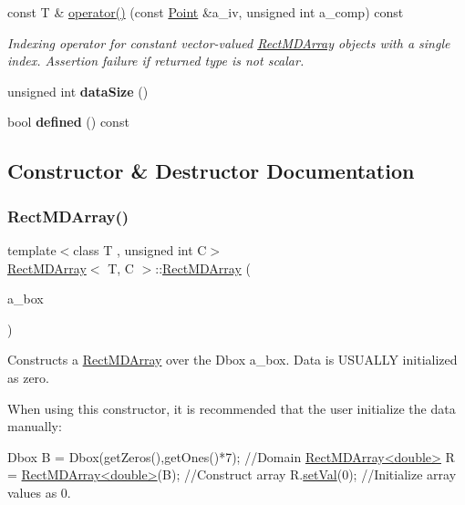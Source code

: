 \begin{DoxyCompactItemize}
const T \& \hyperlink{class_rect_m_d_array_a9b2580f04b9b32089d04826aec554ff9}{operator()} (const \hyperlink{class_point}{Point} \&a\+\_\+iv, unsigned int a\+\_\+comp) const
\begin{DoxyCompactList}\small\item\em Indexing operator for constant vector-\/valued \hyperlink{class_rect_m_d_array}{Rect\+M\+D\+Array} objects with a single index. Assertion failure if returned type is not scalar. \end{DoxyCompactList}\item 
\mbox{\label{class_rect_m_d_array_aae493b00e6278af8f6864e90bf4e7120}} 
unsigned int {\bfseries data\+Size} ()
\item 
\mbox{\label{class_rect_m_d_array_ae2ec8b62ab54e28eaf152b3f63ddb914}} 
bool {\bfseries defined} () const
\end{DoxyCompactItemize}


\subsection{Constructor \& Destructor Documentation}
\mbox{\label{class_rect_m_d_array_ab35dbe45e315471e0fc10002b17e728d}} 
\subsubsection{\texorpdfstring{Rect\+M\+D\+Array()}{RectMDArray()}}
{\footnotesize\ttfamily template$<$class T , unsigned int C$>$ \\
\hyperlink{class_rect_m_d_array}{Rect\+M\+D\+Array}$<$ T, C $>$\+::\hyperlink{class_rect_m_d_array}{Rect\+M\+D\+Array} (\begin{DoxyParamCaption}\item[{const \hyperlink{class_d_box}{D\+Box} \&}]{a\+\_\+box }\end{DoxyParamCaption})}



Constructs a \hyperlink{class_rect_m_d_array}{Rect\+M\+D\+Array} over the Dbox a\+\_\+box. Data is U\+S\+U\+A\+L\+LY initialized as zero. 

When using this constructor, it is recommended that the user initialize the data manually\+: 
\begin{DoxyCode}
Dbox B = Dbox(getZeros(),getOnes()*7);  \textcolor{comment}{//Domain}
\hyperlink{class_rect_m_d_array}{RectMDArray<double>} R = \hyperlink{class_rect_m_d_array}{RectMDArray<double>}(B); \textcolor{comment}{//Construct array}
R.\hyperlink{class_rect_m_d_array_af84b04d2561605c230fef402b5df530e}{setVal}(0);  \textcolor{comment}{//Initialize array values as 0. }
\end{DoxyCode}
 

